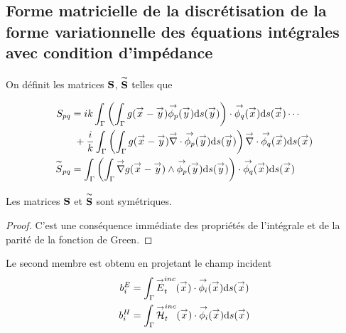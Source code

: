
  \subsection{Forme matricielle de la discrétisation de la forme variationnelle des équations intégrales avec condition d'impédance}

    \begin{defn}
      On définit les matrices \(\mS\), \(\mSt\) telles que

      \begin{align}
        S_{pq}
          &= ik \int_\Gamma \left( \int_\Gamma g(\vx - \vy) \phip(\vy) \dd{s}(\vy) \right) \cdot \phiq (\vx)\dd{s}(\vx) \cdots\\
          \notag&~+ \frac{i}{k}\int_\Gamma \left( \int_\Gamma g(\vx - \vy) \vdiv \phip (\vy) \dd{s}(\vy) \right) \vdiv \phiq(\vx)\dd{s}(\vx)\\
        \tilde{S}_{pq}
          &= \int_\Gamma \left( \int_\Gamma \vgrad g(\vx - \vy) \pvect \phip(\vy) \dd{s}(\vy) \right) \cdot \phiq(\vx)\dd{s}(\vx)
      \end{align}
    \end{defn}

    \begin{prop}
      Les matrices \(\mS\) et \(\mSt\) sont symétriques.
    \end{prop}
    \begin{proof}
      C'est une conséquence immédiate des propriétés de l'intégrale et de la parité de la fonction de Green.
    \end{proof}

    Le second membre est obtenu en projetant le champ incident
    \begin{subequations}
      \begin{align}
        b_i^E &= \int_\Gamma \vE_t^{inc}(\vx) \cdot \phii(\vx)\dd{s}(\vx) \\
        b_i^H &= \int_\Gamma \vH_t^{inc}(\vx) \cdot \phii(\vx)\dd{s}(\vx)
      \end{align}
    \end{subequations}

